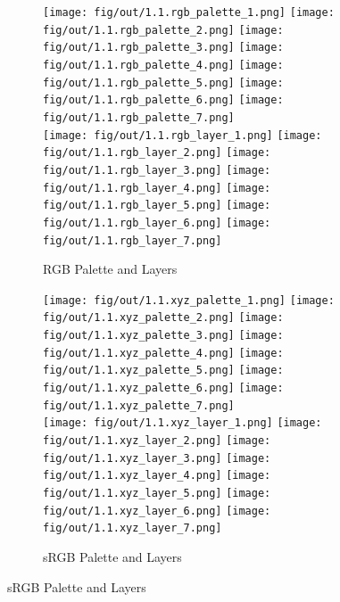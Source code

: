\documentclass[tikz,14pt,fleqn]{article}
\begin{document}
\begin{figure}[h!]
    \centering
    \begin{subfigure}[]{\linewidth}
        \centering
        \texttt{[image: fig/out/1.1.rgb\_palette\_1.png]}
        \texttt{[image: fig/out/1.1.rgb\_palette\_2.png]}
        \texttt{[image: fig/out/1.1.rgb\_palette\_3.png]}
        \texttt{[image: fig/out/1.1.rgb\_palette\_4.png]}
        \texttt{[image: fig/out/1.1.rgb\_palette\_5.png]}
        \texttt{[image: fig/out/1.1.rgb\_palette\_6.png]}
        \texttt{[image: fig/out/1.1.rgb\_palette\_7.png]}\\
        \texttt{[image: fig/out/1.1.rgb\_layer\_1.png]}
        \texttt{[image: fig/out/1.1.rgb\_layer\_2.png]}
        \texttt{[image: fig/out/1.1.rgb\_layer\_3.png]}
        \texttt{[image: fig/out/1.1.rgb\_layer\_4.png]}
        \texttt{[image: fig/out/1.1.rgb\_layer\_5.png]}
        \texttt{[image: fig/out/1.1.rgb\_layer\_6.png]}
        \texttt{[image: fig/out/1.1.rgb\_layer\_7.png]}
        \caption{RGB Palette and Layers}
        \label{fig:1.1.rgb_palette_layers}
    \end{subfigure}
    \begin{subfigure}[]{\linewidth}
        \centering
        \texttt{[image: fig/out/1.1.xyz\_palette\_1.png]}
        \texttt{[image: fig/out/1.1.xyz\_palette\_2.png]}
        \texttt{[image: fig/out/1.1.xyz\_palette\_3.png]}
        \texttt{[image: fig/out/1.1.xyz\_palette\_4.png]}
        \texttt{[image: fig/out/1.1.xyz\_palette\_5.png]}
        \texttt{[image: fig/out/1.1.xyz\_palette\_6.png]}
        \texttt{[image: fig/out/1.1.xyz\_palette\_7.png]}\\
        \texttt{[image: fig/out/1.1.xyz\_layer\_1.png]}
        \texttt{[image: fig/out/1.1.xyz\_layer\_2.png]}
        \texttt{[image: fig/out/1.1.xyz\_layer\_3.png]}
        \texttt{[image: fig/out/1.1.xyz\_layer\_4.png]}
        \texttt{[image: fig/out/1.1.xyz\_layer\_5.png]}
        \texttt{[image: fig/out/1.1.xyz\_layer\_6.png]}
        \texttt{[image: fig/out/1.1.xyz\_layer\_7.png]}
        \caption{sRGB Palette and Layers}
        \label{fig:1.1.srgb_palette_layers}
    \end{subfigure}


\end{figure}
\end{document}
